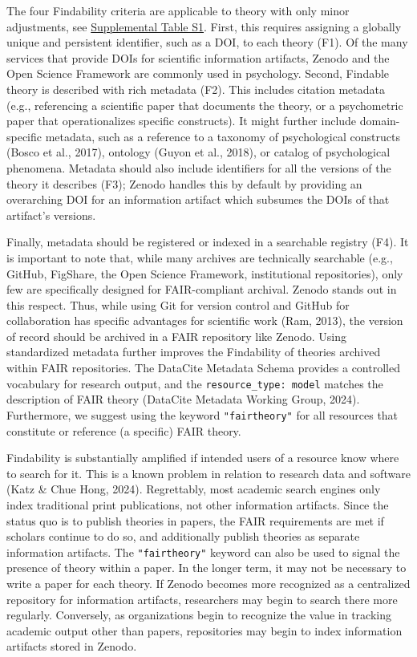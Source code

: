 \documentclass[
  man, noextraspace,floatsintext]{apa7}
\begin{document}
The four Findability criteria are applicable to theory with only minor adjustments, see \href{https://github.com/cjvanlissa/fair_theory/blob/main/fair_principles.csv}{Supplemental Table S1}.
First, this requires assigning a globally unique and persistent identifier, such as a DOI, to each theory (F1).
Of the many services that provide DOIs for scientific information artifacts,
Zenodo and the Open Science Framework are commonly used in psychology.
Second, Findable theory is described with rich metadata (F2).
This includes citation metadata (e.g., referencing a scientific paper that documents the theory, or a psychometric paper that operationalizes specific constructs).
It might further include domain-specific metadata, such as a reference to a taxonomy of psychological constructs (Bosco et al., 2017),
ontology (Guyon et al., 2018),
or catalog of psychological phenomena.
Metadata should also include identifiers for all the versions of the theory it describes (F3);
Zenodo handles this by default by providing an overarching DOI for an information artifact which subsumes the DOIs of that artifact's versions.

Finally, metadata should be registered or indexed in a searchable registry (F4).
It is important to note that, while many archives are technically searchable (e.g., GitHub, FigShare, the Open Science Framework, institutional repositories),
only few are specifically designed for FAIR-compliant archival.
Zenodo stands out in this respect.
Thus, while using Git for version control and GitHub for collaboration has specific advantages for scientific work (Ram, 2013),
the version of record should be archived in a FAIR repository like Zenodo.
Using standardized metadata further improves the Findability of theories archived within FAIR repositories.
The DataCite Metadata Schema provides a controlled vocabulary for research output, and the \texttt{resource\_type:\ model} matches the description of FAIR theory (DataCite Metadata Working Group, 2024).
Furthermore, we suggest using the keyword \texttt{"fairtheory"} for all resources that constitute or reference (a specific) FAIR theory.

Findability is substantially amplified if intended users of a resource know where to search for it.
This is a known problem in relation to research data and software (Katz \& Chue Hong, 2024).
Regrettably, most academic search engines only index traditional print publications, not other information artifacts.
Since the status quo is to publish theories in papers,
the FAIR requirements are met if scholars continue to do so,
and additionally publish theories as separate information artifacts.
The \texttt{"fairtheory"} keyword can also be used to signal the presence of theory within a paper.
In the longer term, it may not be necessary to write a paper for each theory.
If Zenodo becomes more recognized as a centralized repository for information artifacts, researchers may begin to search there more regularly.
Conversely, as organizations begin to recognize the value in tracking academic output other than papers, repositories may begin to index information artifacts stored in Zenodo.
\end{document}
